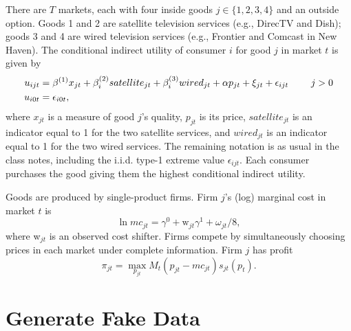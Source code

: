 \documentclass{article}
\begin{document}
\begin{tcolorbox}
There are $T$ markets, each with four inside goods $j\in
\{1,2,3,4\}$ and an outside option. Goods 1 and 2 are satellite television
services (e.g., DirecTV and Dish); goods 3 and 4 are wired television
services (e.g., Frontier and Comcast in New Haven).
The conditional indirect utility of consumer $i$ for good $j$ in market $t$
is given by
\begin{align*}
u_{ijt}& =\beta ^{\left( 1\right) }x_{jt}+\beta
_{i}^{(2)}satellite_{jt}+\beta _{i}^{(3)}wired_{jt}+\alpha p_{jt}+\xi
_{jt}+\epsilon _{ijt}\text{ \qquad }j>0 \\
u_{i0t}& =\epsilon _{i0t},
\end{align*}%
where $x_{jt}$ is a measure of good $j$'s quality, $p_{jt}$ is its price, $%
satellite_{jt}$ is an indicator equal to 1 for the two satellite services,
and $wired_{jt}$ is an indicator equal to 1 for the two wired services. The
remaining notation is as usual in the class notes, including the i.i.d.
type-1 extreme value $\epsilon _{ijt}$.  Each consumer purchases the good giving them the highest conditional indirect utility.

Goods are produced by single-product firms. Firm $j$'s (log) marginal
cost in market $t$ is 
\begin{equation*}
\ln mc_{jt}=\gamma ^{0}+\text{w}_{jt}\gamma ^{1}+\omega _{jt}/8,
\end{equation*}%
where w$_{jt}$ is an observed cost shifter. Firms compete by simultaneously choosing prices in each market under complete information. Firm $j$ has profit
\begin{equation*}
\pi _{jt}=\max_{p_{jt}}M_{t}(p_{jt}-mc_{jt})s_{jt}(p_{t}).
\end{equation*}
\end{tcolorbox}

\section*{Generate Fake Data}
\end{document}
